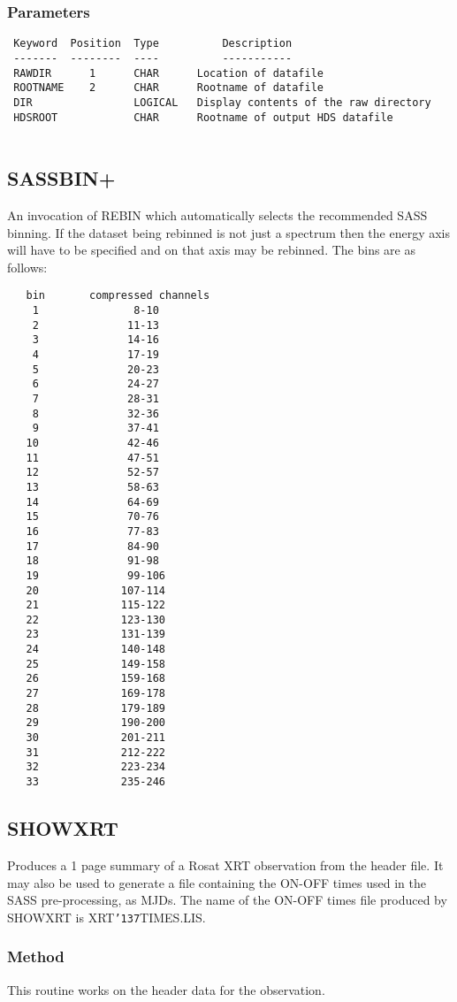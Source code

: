 \documentclass{book}
\renewcommand{\_}{{\tt\char'137}}     %
\begin{document}
\subsubsection{Parameters}
\begin{verbatim}
 Keyword  Position  Type          Description
 -------  --------  ----          -----------
 RAWDIR      1      CHAR      Location of datafile
 ROOTNAME    2      CHAR      Rootname of datafile
 DIR                LOGICAL   Display contents of the raw directory
 HDSROOT            CHAR      Rootname of output HDS datafile
 
\end{verbatim}\subsection{SASSBIN+}
An invocation of REBIN which automatically selects the recommended
SASS binning. If the dataset being rebinned is not just a spectrum
then the energy axis will have to be specified and on that axis may
be rebinned. The bins are as follows:
\begin{verbatim}
   bin       compressed channels
    1               8-10
    2              11-13
    3              14-16
    4              17-19
    5              20-23
    6              24-27
    7              28-31
    8              32-36
    9              37-41
   10              42-46
   11              47-51
   12              52-57
   13              58-63
   14              64-69
   15              70-76
   16              77-83
   17              84-90
   18              91-98
   19              99-106
   20             107-114
   21             115-122
   22             123-130
   23             131-139
   24             140-148
   25             149-158
   26             159-168
   27             169-178
   28             179-189
   29             190-200
   30             201-211
   31             212-222
   32             223-234
   33             235-246
\end{verbatim}
\subsection{SHOWXRT}
Produces a 1 page summary of a Rosat XRT observation from the
header file. It may also be used to generate a file containing the
ON-OFF times used in the SASS pre-processing, as MJDs. The
name of the ON-OFF times file produced by SHOWXRT is XRT\_TIMES.LIS.
 
\subsubsection{Method}
This routine works on the header data for the observation.
 
\end{document}
